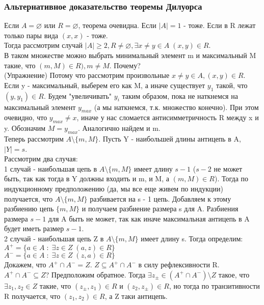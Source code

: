 \subsubsection{Альтернативное доказательство теоремы Дилуорса}
Если $A = \varnothing$ или $R = \varnothing$, теорема очевидна. Если $|A| = 1$ - тоже. Если в R лежат только пары вида $(x, x)$ - тоже.\\
Тогда рассмотрим случай $|A| \geq 2, R \not= \varnothing, \exists x \not= y \in A \; (x, y) \in R$.\\
В таком множестве можно выбрать минимальный элемент m и максимальный M такие, что $(m, M) \in R), m \not= M$. Почему?\\
(Упражнение) Потому что рассмотрим произвольные $x \not= y \in A, (x, y) \in R$. Если y - максимальный, выберем его как M, а иначе существует $y_1$ такой, что $(y, y_1) \in R$. Будем "увеличивать" $y_i$ таким образом, пока не наткнемся на максимальный элемент $y_{max}$ (а мы наткнемся, т.к. множество конечно). При этом очевидно, что $y_{max} \not= x$, иначе у нас сломается антисимметричность R между x и y. Обозначим $M = y_{max}$. Аналогично найдем и m. \\
Теперь рассмотрим $A \setminus \{m, M\}$. Пусть Y - наибольшей длины антицепь в A, $|Y| = s$.\\
Рассмотрим два случая: \\
1 случай - наибольшая цепь в $A \setminus \{m, M\}$ имеет длину $s - 1$ ($s - 2$ не может быть, так как тогда в Y должны входить и m, и M, а $(m, M) \in R$). Тогда по индукционному предположению (да, мы все еще живем по индукции) получается, что $A \setminus \{m, M\}$ разбивается на s - 1 цепь. Добавляем к этому разбиению цепь $\{m, M\}$ и получаем разбиение размера s для A. Разбиения размера $s - 1$ для A быть не может, так как иначе максимальная антицепь в A будет иметь размер $s - 1$.\\
2 случай - наибольшая цепь Z в $A \setminus \{m, M\}$ имеет длину s. Тогда определим:\\
$A^+ = \{a \in A \; : \; \exists z \in Z \; (a, z) \in R\}$\\
$A^- = \{a \in A \; : \; \exists z \in Z \; (z, a) \in R\}$\\
Докажем, что $A^+ \cap A^- = Z$. $Z \subseteq A^+ \cap A^-$ в силу рефлексивности R. $A^+ \cap A^- \subseteq Z$? Предположим обратное. Тогда $\exists z_{\pm} \in (A^+ \cap A^-) \setminus Z$ такое, что $\exists z_1, z_2 \in Z$ такие, что $(z_{\pm}, z_1) \in R$ и $(z_2, z_{\pm}) \in R$, но тогда по транзитивности R получается, что $(z_1, z_2) \in R$, а Z таки антицепь.\\
